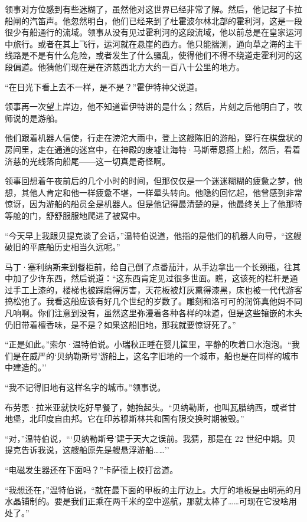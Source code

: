 \documentclass[AutoFakeBold=true]{book}
\begin{document}
领事对方位感到有些迷糊了，虽然他对这世界已经非常了解。然后，他记起了卡拉船闸的汽笛声。他忽然明白，他们已经来到了杜霍波尔林北部的霍利河，这是一段很少有船通行的流域。领事从没有见过霍利河的这段流域，他以前总是在皇家运河中旅行。或者在其上飞行，运河就在悬崖的西方。他只能揣测，通向草之海的主干线路是不是有什么危险，或者发生了什么骚乱，使得他们不得不绕道走霍利河的这段偏道。他猜他们现在是在济慈西北方大约一百八十公里的地方。

``在日光下看上去不一样，是不是？''霍伊特神父说道。

领事再一次望上岸边，他不知道霍伊特讲的是什么；然后，片刻之后他明白了，牧师说的是游船。

他们跟着机器人信使，行走在滂沱大雨中，登上这艘陈旧的游船，穿行在棋盘状的房间里，走在通道的迷宫中，在神殿的废墟让海特·马斯蒂恩搭上船，然后，看着济慈的光线落向船尾——这一切真是奇怪啊。

领事回想着午夜前后的几个小时的时间，但那仅仅是一个迷迷糊糊的疲惫之梦，他想，其他人肯定和他一样疲惫不堪，一样晕头转向。他隐约回忆起，他曾感到非常惊讶，因为游船的船员全是机器人。但是他记得最清楚的是，他最终关上了他那特等舱的门，舒舒服服地爬进了被窝中。

``今天早上我跟贝提克谈了会话，''温特伯说道，他指的是他们的机器人向导，``这艘破旧的平底船历史相当久远呢。''

马丁·塞利纳斯来到餐柜前，给自己倒了点番茄汁，从手边拿出一个长颈瓶，往其中加了少许东西，然后说道：``这东西肯定见过很多世面。瞧，这该死的栏杆是通过手工上漆的，楼梯也被踩磨得厉害，天花板被灯灰熏得漆黑，床也被一代代游客搞松弛了。我看这船应该有好几个世纪的岁数了。雕刻和洛可可的润饰真他妈不同凡响啊。你们注意到没有，虽然这里弥漫着各种各样的味道，但是这些镶嵌的木头仍旧带着檀香味，是不是？如果这船旧地，那我就要惊讶死了。''

``正是如此。''索尔·温特伯说。小瑞秋正睡在婴儿筐里，平静的吹着口水泡泡。``我们是在威严的`贝纳勒斯号'游船上，这名字旧地的一个城市，船也是在同样的城市中建造的。''

``我不记得旧地有这样名字的城市。''领事说。

布劳恩·拉米亚就快吃好早餐了，她抬起头。``贝纳勒斯，也叫瓦腊纳西，或者甘地堡，北印度自由邦。它在印苏穆斯林共和国有限交换时期被毁。''

``对，''温特伯说，```贝纳勒斯号'建于天大之误前。我猜，那是在 22 世纪中期。贝提克告诉我说，这艘船原先是艘悬浮游船……''

``电磁发生器还在下面吗？''卡萨德上校打岔道。

``我想还在，''温特伯说，``就在最下面的甲板的主厅边上。大厅的地板是由明亮的月水晶铺制的。要是我们正乘在两千米的空中巡航，那就太棒了……可现在它没啥用处了。''
\end{document}
